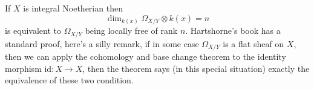 \documentclass[../main.tex]{subfiles}
\begin{document}
\begin{example}
If $X$ is integral Noetherian then $$\dim_{k(x)}\Omega_{X/Y}\otimes k(x)=n$$
is equivalent to $\Omega_{X/Y}$ being locally free of rank $n$. Hartshorne's book has a standard proof, here's a silly remark, if in some case $\Omega_{X/Y}$ is a flat sheaf on $X$, then we can apply the cohomology and base change theorem to the identity morphism $\mathrm{id}:X\rightarrow X$, then the theorem says (in this special situation) exactly the equivalence of these two condition.
\end{example}
\end{document}
